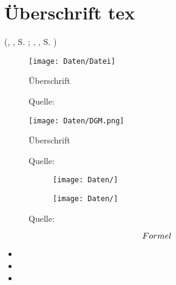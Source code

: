 
\section[Überschrift]{\texorpdfstring{Überschrift tex}{Überschrift pdf}}


\textcolor{HCU}{}
\textcolor{red1}{}




(\citeauthor{}, \citeyearNP{}, S. ; \citeauthor{}, \citeyearNP{}, S. )


\begin{figure}[H]
	\centering
	\texttt{[image: Daten/Datei]}
	\caption{Überschrift}
	\caption*{Quelle: \citeA{}}
	\label{fig:}
\end{figure}


\begin{figure}[H]
	\centering
	\texttt{[image: Daten/DGM.png]}
	\caption{Überschrift}
	\caption*{Quelle: \citeA{}}
	\label{fig:}
\end{figure}


\begin{figure}[H]
	\begin{subfigure}[c]{0.48\textwidth}
		\texttt{[image: Daten/]}
		\subcaption{}
		\label{fig:}
	\end{subfigure}
	\hfill
	\begin{subfigure}[c]{0.48\textwidth}
		\texttt{[image: Daten/]}
		\subcaption{}
		\label{fig:}
	\end{subfigure}
	\caption{}
	\caption*{Quelle: \citeA[]{}}
	\label{fig:}
\end{figure}


\begin{equation}
	\numberwithin{equation}{section}
	Formel \label{eq:Label} \\
\end{equation}





\begin{itemize}	
	\setlength{\itemsep}{-2pt}
	\item 
	\item 
	\item 
\end{itemize}


